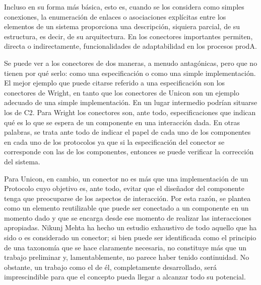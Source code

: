 Incluso en su forma más básica, esto es, cuando se los considera como simples
conexiones, la enumeración de enlaces o asociaciones explícitas entre los
elementos de un sistema proporciona una descripción, siquiera parcial, de su
estructura, es decir, de su arquitectura. En \cite{arqDHD} los conectores importantes permiten, directa o indirectamente, funcionalidades de adaptabilidad en los procesos prodA.

Se puede ver a los conectores de dos maneras, a
menudo antagónicas, pero que no tienen por qué serlo: como una
especificación o como una simple implementación. El mejor ejemplo que puede citarse referido a una especificación son los conectores de Wright, en tanto que los conectores 
de Unicon son un ejemplo adecuado de una simple implementación. En un lugar intermedio podrían
situarse los de C2. Para Wright los conectores son, ante
todo, especificaciones que indican qué es lo que se espera de un componente en
una interacción dada. En otras palabras,  se trata ante todo de indicar el papel de cada
uno de los componentes en cada uno de los protocolos ya que si la especificación del
conector se corresponde con las de los componentes, entonces se puede verificar la
corrección del sistema.

Para Unicon, en cambio, un conector no es más que una implementación de un
Protocolo cuyo objetivo es, ante todo, evitar que el diseñador del componente
tenga que preocuparse de los aspectos de interacción. Por esta razón, se plantea
como un elemento reutilizable que puede ser conectado a un componente en un
momento dado y que se encarga desde ese momento de realizar las interacciones
apropiadas. Nikunj Mehta \cite{MMP00} ha hecho un estudio exhaustivo de todo aquello
que ha sido o es considerado un conector; si bien puede ser identificada como el principio de una
taxonomía que se hace claramente necesaria, no constituye más que un trabajo
preliminar y, lamentablemente, no parece haber tenido continuidad. No obstante,
un trabajo como el de él, completamente desarrollado, será imprescindible para
que el concepto pueda llegar a alcanzar todo su potencial.

